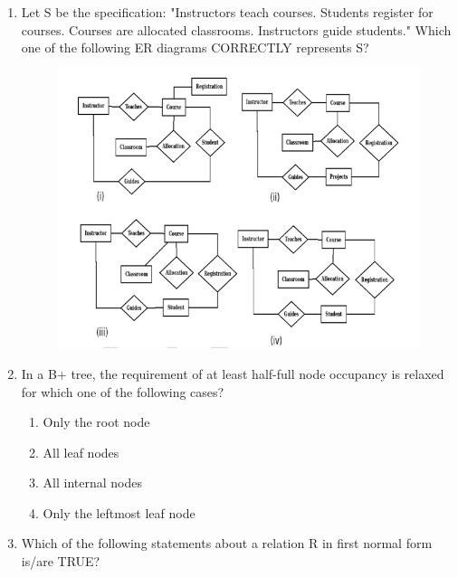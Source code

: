 \documentclass[a4paper, 11pt]{article}
\begin{document}
\begin{enumerate}
    \item Let S be the specification: "Instructors teach courses. Students register for courses. Courses are allocated classrooms. Instructors guide students." Which one of the following ER diagrams CORRECTLY represents S?

    \begin{figure}[H]
        \centering
        \includegraphics[width=0.7\columnwidth]{figs/q20.png}       
        \label{fig:placeholder}
    \end{figure}
    \begin{enumerate}
    \end{enumerate}

   \hfill{}
    \item In a B+ tree, the requirement of at least half-full  node occupancy is relaxed for which one of the following cases?

    \begin{enumerate}
        \item Only the root node
        \item All leaf nodes
        \item All internal nodes
        \item Only the leftmost leaf node
    \end{enumerate}
    \hfill{}

    \item Which of the following statements about a relation R in first normal form  is/are TRUE?


\end{enumerate}
\end{document}
